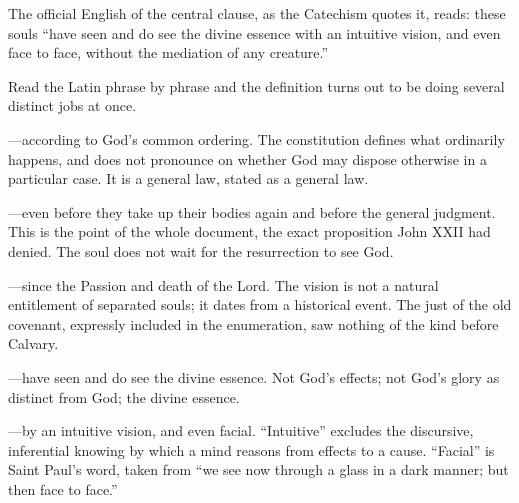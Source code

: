 The official English of the central clause, as the Catechism quotes it, reads: these souls ``have seen and do see the divine essence with an intuitive vision, and even face to face, without the mediation of any creature.''

Read the Latin phrase by phrase and the definition turns out to be doing several distinct jobs at once.

\emph{}---according to God's common ordering. The constitution defines what ordinarily happens, and does not pronounce on whether God may dispose otherwise in a particular case. It is a general law, stated as a general law.

\emph{}---even before they take up their bodies again and before the general judgment. This is the point of the whole document, the exact proposition John XXII had denied. The soul does not wait for the resurrection to see God.

\emph{}---since the Passion and death of the Lord. The vision is not a natural entitlement of separated souls; it dates from a historical event. The just of the old covenant, expressly included in the enumeration, saw nothing of the kind before Calvary.

\emph{}---have seen and do see the divine essence. Not God's effects; not God's glory as distinct from God; the divine essence.

\emph{}---by an intuitive vision, and even facial. ``Intuitive'' excludes the discursive, inferential knowing by which a mind reasons from effects to a cause. ``Facial'' is Saint Paul's word, taken from ``we see now through a glass in a dark manner; but then face to face.''

